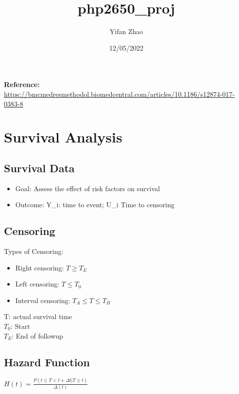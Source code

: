 \documentclass[
]{article}
\title{php2650\_proj}
\author{Yifan Zhao}
\date{12/05/2022}
\providecommand{\tightlist}{%
  \setlength{\itemsep}{0pt}\setlength{\parskip}{0pt}}
\begin{document}
\maketitle

\textbf{Reference:}
\url{https://bmcmedresmethodol.biomedcentral.com/articles/10.1186/s12874-017-0383-8}

\hypertarget{survival-analysis}{%
\section{Survival Analysis}\label{survival-analysis}}

\hypertarget{survival-data}{%
\subsection{Survival Data}\label{survival-data}}

\begin{itemize}
\tightlist
\item
  Goal: Assess the effect of risk factors on survival
\item
  Outcome: Y\_i: time to event; U\_i Time to censoring
\end{itemize}

\hypertarget{censoring}{%
\subsection{Censoring}\label{censoring}}

Types of Censoring:

\begin{itemize}
\tightlist
\item
  Right censoring: \(T \geq T_E\)
\item
  Left censoring: \(T \leq T_0\)
\item
  Interval censoring: \(T_A \leq T \leq T_B\)
\end{itemize}

T: actual survival time\\
\(T_0\): Start\\
\(T_E\): End of followup

\hypertarget{hazard-function}{%
\subsection{Hazard Function}\label{hazard-function}}

\(H(t) = \frac {P(t\leq T<t+\Delta t|T\geq t)} {\Delta(t)}\)
\end{document}
